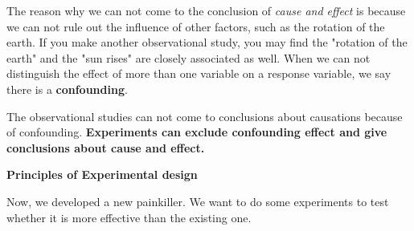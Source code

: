 \documentclass[a4paper, 12pt,twoside]{book}
\begin{document}
The reason why we can not come to the conclusion of \textit{cause and effect} is because we can not rule out the influence of other factors, such as the rotation of the earth. If you make another observational study, you may find the "rotation of the earth" and the "sun rises" are closely associated as well. When we can not distinguish the effect of more than one variable on a response variable, we say there is a \textbf{confounding}.
\vspace{0.3cm}\\

\noindent
\colorbox{babypink}{\parbox{\textwidth}{
   The observational studies can not come to conclusions about causations because of confounding. 
   \textbf{Experiments can exclude confounding effect and give conclusions about cause and effect.}
}}
\vspace{0.3cm}

\vspace{0.6cm}

\textbf{\large{Principles of Experimental design}}
\vspace{0.3cm}

Now, we developed a new painkiller. We want to do some experiments to test whether it is more effective than the existing one. 
\vspace{0.3cm}
\end{document}
